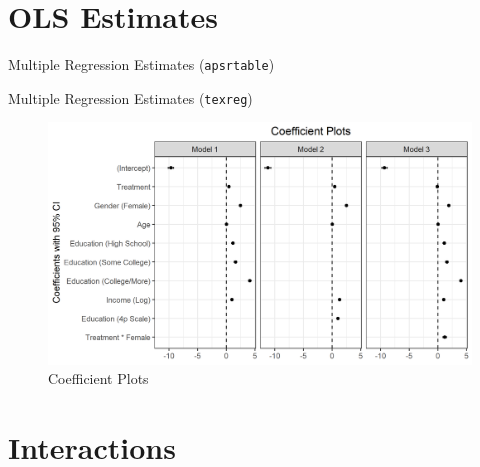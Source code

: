 \documentclass[letterpaper, 12pt]{article}
\begin{document}
    \clearpage %

    \section{OLS Estimates}

    \begin{table}[h!] %
        \centering %
        \caption{Multiple Regression Estimates (\texttt{apsrtable})} %
        \label{apsrtab} %
    \end{table}

    \begin{table}[h!] %
        \centering %
        \caption{Multiple Regression Estimates (\texttt{texreg})} %
        \label{texregtab} %
    \end{table}

    \begin{figure}[h!] %
        \centering
          \includegraphics[width=6in]{cp.png}
          \caption{Coefficient Plots} %
          \label{cp} %
    \end{figure}


    \section{Interactions}
\end{document}
